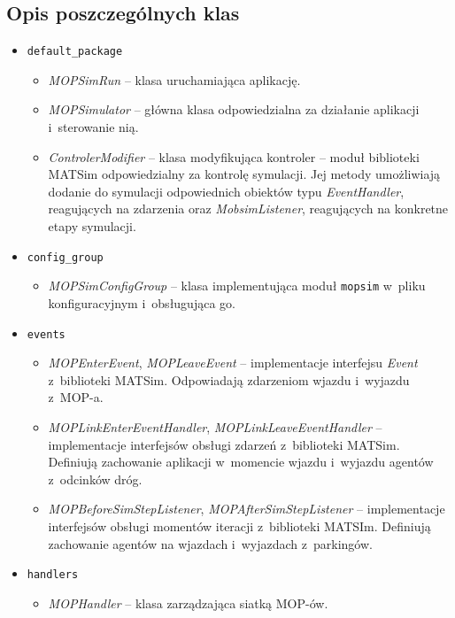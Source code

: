 \subsection{Opis poszczególnych klas}
\begin{itemize}
    \item \texttt{default\_package}
        \begin{itemize}
        \item \textit{MOPSimRun} -- klasa uruchamiająca aplikację.
        \item \textit{MOPSimulator} -- główna klasa odpowiedzialna za działanie aplikacji i~sterowanie nią.
        \item \textit{ControlerModifier} -- klasa modyfikująca kontroler -- moduł biblioteki MATSim odpowiedzialny za kontrolę symulacji. Jej metody umożliwiają dodanie do symulacji odpowiednich obiektów typu \textit{EventHandler}, reagujących na zdarzenia oraz \textit{MobsimListener}, reagujących na konkretne etapy symulacji.
        \end{itemize}
    \item \texttt{config\_group}
        \begin{itemize}
            \item \textit{MOPSimConfigGroup} -- klasa implementująca moduł \texttt{mopsim} w~pliku konfiguracyjnym i~obsługująca go.
        \end{itemize}
    \item \texttt{events}
        \begin{itemize}
            \item \textit{MOPEnterEvent}, \textit{MOPLeaveEvent} -- implementacje interfejsu \textit{Event} z~biblioteki MATSim. Odpowiadają zdarzeniom wjazdu i~wyjazdu z~MOP-a.
            \item \textit{MOPLinkEnterEventHandler}, \textit{MOPLinkLeaveEventHandler} -- implementacje interfejsów obsługi zdarzeń z~biblioteki MATSim. Definiują zachowanie aplikacji w~momencie wjazdu i~wyjazdu agentów z~odcinków dróg.
            \item \textit{MOPBeforeSimStepListener}, \textit{MOPAfterSimStepListener} -- implementacje interfejsów obsługi momentów iteracji z~biblioteki MATSIm. Definiują zachowanie agentów na wjazdach i~wyjazdach z~parkingów.
        \end{itemize}
    \item \texttt{handlers}
        \begin{itemize}
            \item \textit{MOPHandler} -- klasa zarządzająca siatką MOP-ów.

\end{itemize}
\end{itemize}
